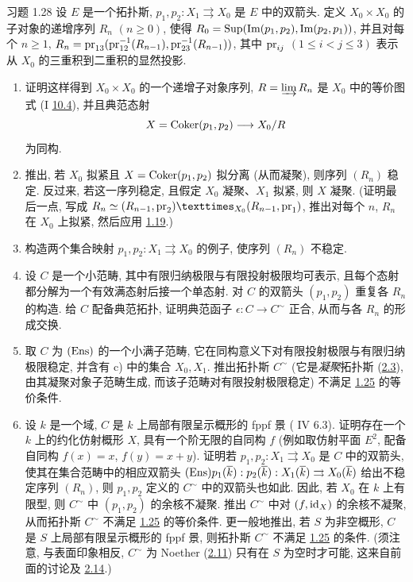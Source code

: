 \begin{enonce*}[remark]{习题 1.28}
设 $E$ 是一个拓扑斯,
$p_1,p_2:X_1\rightrightarrows X_0$ 是 $E$ 中的双箭头.
定义 $X_0\times X_0$ 的子对象的递增序列 $R_n$ $(n\geq0)$,
使得 $R_0=\operatorname{Sup}(\text{Im}(p_1,p_2),\text{Im}(p_2,p_1))$,
并且对每个 $n\geq1$,
$R_n=\operatorname{pr}_{13}(\operatorname{pr}_{12}^{-1}(R_{n-1}),\operatorname{pr}_{23}^{-1}(R_{n-1}))$,
其中 $\operatorname{pr}_{ij}$ $(1\leq i<j\leq3)$
表示从 $X_0$ 的三重积到二重积的显然投影.
\begin{enumerate}
\renewcommand{\theenumi}{\alph{enumi}}
\renewcommand{\labelenumi}{\theenumi)}
\item 证明这样得到 $X_0\times X_0$ 的一个递增子对象序列,
$R=\varinjlim R_n$ 是 $X_0$ 中的等价图式
(I \hyperref[I.sec10.4]{10.4}), 并且典范态射
$$
X = \Coker (p_1, p_2) \to X_0 /R
$$
为同构.

\item 推出, 若 $X_0$ 拟紧且 $X=\operatorname{Coker}(p_1,p_2)$ 拟分离
(从而凝聚), 则序列 $(R_n)$ 稳定.
反过来\pageoriginale{}, 若这一序列稳定,
且假定 $X_0$ 凝聚、$X_1$ 拟紧, 则 $X$ 凝聚.
(证明最后一点, 写成
$R_n\simeq\fprod{(R_{n-1},\pr_2)}{(R_{n-1},\pr_1)}{X_0}$,
推出对每个 $n$, $R_n$ 在 $X_0$ 上拟紧,
然后应用 \hyperref[VI.cor1.19]{1.19}.)

\item 构造两个集合映射 $p_1,p_2:X_1\rightrightarrows X_0$ 的例子,
使序列 $(R_n)$ 不稳定.

\item 设 $C$ 是一个小范畴,
其中有限归纳极限与有限投射极限均可表示,
且每个态射都分解为一个有效满态射后接一个单态射.
对 $C$ 的双箭头 $(p_1,p_2)$ 重复各 $R_n$ 的构造.
给 $C$ 配备典范拓扑,
证明典范函子 $\epsilon:C\to C^{\sim}$ 正合,
从而与各 $R_n$ 的形成交换.

\item 取 $C$ 为 $(\operatorname{Ens})$ 的一个小满子范畴,
它在同构意义下对有限投射极限与有限归纳极限稳定,
并含有 c) 中的集合 $X_0,X_1$.
推出拓扑斯 $C^{\sim}$
(它是\emph{凝聚}拓扑斯 (\hyperref[VI.def2.3]{2.3}),
\ie 由其凝聚对象子范畴生成, 而该子范畴对有限投射极限稳定)
不满足 \hyperref[VI.cor1.25]{1.25} 的等价条件.

\item 设 $k$ 是一个域,
$C$ 是 $k$ 上局部有限呈示概形的 fppf 景 ( IV 6.3).
证明存在一个 $k$ 上的约化仿射概形 $X$,
具有一个阶无限的自同构 $f$
(例如取仿射平面 $E^2$, 配备自同构 $f(x)=x$, $f(y)=x+y$).\pageoriginale{}
证明若 $p_1,p_2:X_1\rightrightarrows X_0$ 是 $C$ 中的双箭头,
使其在集合范畴中的相应双箭头
$(\operatorname{Ens}) p_1(\overline{k}):p_2(\overline{k}):
  X_1(\overline{k})\rightrightarrows X_0(\overline{k})$
给出不稳定序列 $(R_n)$,
则 $p_1,p_2$ 定义的 $C^{\sim}$ 中的双箭头也如此.
因此, 若 $X_0$ 在 $k$ 上有限型,
则 $C^{\sim}$ 中 $(p_1,p_2)$ 的余核不凝聚.
推出 $C^{\sim}$ 中对 $(f,\operatorname{id}_X)$ 的余核不凝聚,
从而拓扑斯 $C^{\sim}$ 不满足 \hyperref[VI.cor1.25]{1.25} 的等价条件.
更一般地推出, 若 $S$ 为非空概形,
$C$ 是 $S$ 上局部有限呈示概形的 fppf 景,
则拓扑斯 $C^{\sim}$ 不满足 \hyperref[VI.cor1.25]{1.25} 的条件.
(须注意, 与表面印象相反,
$C^{\sim}$ 为 Noether (\hyperref[VI.def2.11]{2.11})
只有在 $S$ 为空时才可能,
这来自前面的讨论及 \hyperref[VI.subsec2.14]{2.14}.)
\end{enumerate}
\end{enonce*}

